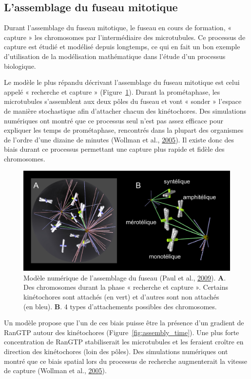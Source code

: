 \documentclass[12pt,a4paper,twoside,openright]{book}
\begin{document}
\subsection{L'assemblage du fuseau
mitotique}\label{lassemblage-du-fuseau-mitotique}

Durant l'assemblage du fuseau mitotique, le fuseau en cours de
formation, « capture » les chromosomes par l'intermédiaire des
microtubules. Ce processus de capture est étudié et modélisé depuis
longtemps, ce qui en fait un bon exemple d'utilisation de la
modélisation mathématique dans l'étude d'un processus biologique.

Le modèle le plus répandu décrivant l'assemblage du fuseau mitotique est
celui appelé « recherche et capture » (Figure~\ref{fig:mogilner}).
Durant la prométaphase, les microtubules s'assemblent aux deux pôles du
fuseau et vont « sonder » l'espace de manière stochastique afin
d'attacher chacun des kinétochores. Des simulations numériques ont
montré que ce processus seul n'est pas assez efficace pour expliquer les
temps de prométaphase, rencontrés dans la plupart des organismes de
l'ordre d'une dizaine de minutes (Wollman et al.,
\hyperref[ref-Wollman2005]{2005}). Il existe donc des biais durant ce
processus permettant une capture plus rapide et fidèle des chromosomes.

\begin{figure}[htbp]
\centering
\includegraphics{figures/intro/mogilner.png}
\caption[Modèle numérique de l'assemblage du fuseau]{\label{fig:mogilner}Modèle
numérique de l'assemblage du fuseau (Paul et al.,
\hyperref[ref-Paul2009]{2009}). \textbf{A}. Des chromosomes durant la
phase « recherche et capture ». Certains kinétochores sont attachés (en
vert) et d'autres sont non attachés (en bleu). \textbf{B}. 4 types
d'attachements possibles des chromosomes.}
\end{figure}

Un modèle propose que l'un de ces biais puisse être la présence d'un
gradient de RanGTP autour des kinétochores
(Figure~\ref{fig:assembly_time}). Une plus forte concentration de RanGTP
stabiliserait les microtubules et les feraient croître en direction des
kinétochores (loin des pôles). Des simulations numériques ont montré que
ce biais spatial lors du processus de recherche augmenterait la vitesse
de capture (Wollman et al., \hyperref[ref-Wollman2005]{2005}).
\end{document}
